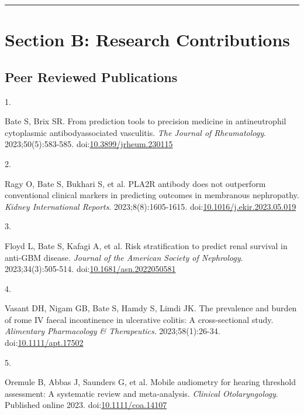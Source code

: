 \documentclass[
]{article}
\newlength{\cslhangindent}
\newlength{\csllabelwidth}
\newlength{\cslentryspacingunit} %
\newenvironment{CSLReferences}[2] %
 {%
  \setlength{\parindent}{0pt}
  \ifodd #1
  \let\oldpar\par
  \def\par{\hangindent=\cslhangindent\oldpar}
  \fi
  \setlength{\parskip}{#2\cslentryspacingunit}
 }%
 {}
\newcommand{\CSLLeftMargin}[1]{\parbox[t]{\csllabelwidth}{#1}}
\newcommand{\CSLRightInline}[1]{\parbox[t]{\linewidth - \csllabelwidth}{#1}\break}
\begin{document}
\begin{center}\rule{0.5\linewidth}{0.5pt}\end{center}

\hypertarget{section-b-research-contributions}{%
\section{Section B: Research
Contributions}\label{section-b-research-contributions}}

\hypertarget{peer-reviewed-publications}{%
\subsection{Peer Reviewed
Publications}\label{peer-reviewed-publications}}

\hypertarget{refs}{}
\begin{CSLReferences}{0}{0}
\leavevmode{}%
\CSLLeftMargin{1. }%
\CSLRightInline{Bate S, Brix SR. From prediction tools to precision
medicine in antineutrophil cytoplasmic antibody{\textendash}associated
vasculitis. \emph{The Journal of Rheumatology}. 2023;50(5):583-585.
doi:\href{https://doi.org/10.3899/jrheum.230115}{10.3899/jrheum.230115}}

\leavevmode{}%
\CSLLeftMargin{2. }%
\CSLRightInline{Ragy O, Bate S, Bukhari S, et al. PLA2R antibody does
not outperform conventional clinical markers in predicting outcomes in
membranous nephropathy. \emph{Kidney International Reports}.
2023;8(8):1605-1615.
doi:\href{https://doi.org/10.1016/j.ekir.2023.05.019}{10.1016/j.ekir.2023.05.019}}

\leavevmode{}%
\CSLLeftMargin{3. }%
\CSLRightInline{Floyd L, Bate S, Kafagi A, et al. Risk stratification to
predict renal survival in anti-GBM disease. \emph{Journal of the
American Society of Nephrology}. 2023;34(3):505-514.
doi:\href{https://doi.org/10.1681/asn.2022050581}{10.1681/asn.2022050581}}

\leavevmode{}%
\CSLLeftMargin{4. }%
\CSLRightInline{Vasant DH, Nigam GB, Bate S, Hamdy S, Limdi JK. The
prevalence and burden of rome IV faecal incontinence in ulcerative
colitis: A cross-sectional study. \emph{Alimentary Pharmacology \&
Therapeutics}. 2023;58(1):26-34.
doi:\href{https://doi.org/10.1111/apt.17502}{10.1111/apt.17502}}

\leavevmode{}%
\CSLLeftMargin{5. }%
\CSLRightInline{Oremule B, Abbas J, Saunders G, et al. Mobile audiometry
for hearing threshold assessment: A systematic review and meta-analysis.
\emph{Clinical Otolaryngology}. Published online 2023.
doi:\href{https://doi.org/10.1111/coa.14107}{10.1111/coa.14107}}


\end{CSLReferences}
\end{document}
